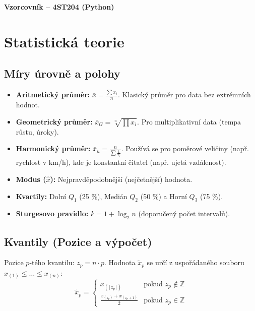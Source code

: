 \documentclass[a4paper, 11pt]{article}
\begin{document}
\begin{center}
\Huge \textbf{Vzorcovník -- 4ST204 (Python)}
\end{center}

\section{Statistická teorie}

\subsection*{Míry úrovně a polohy}
\begin{itemize}[noitemsep]
    \item \textbf{Aritmetický průměr:} $\bar{x} = \frac{\sum x_i}{n}$. Klasický průměr pro data bez extrémních hodnot.
    \item \textbf{Geometrický průměr:} $\bar{x}_{G} = \sqrt[n]{\prod x_i}$. Pro multiplikativní data (tempa růstu, úroky).
    \item \textbf{Harmonický průměr:} $\bar{x}_h = \frac{n}{\sum \frac{1}{x_i}}$. Používá se pro poměrové veličiny (např. rychlost v km/h), kde je konstantní čitatel (např. ujetá vzdálenost).
    \item \textbf{Modus ($\hat{x}$):} Nejpravděpodobnější (nejčetnější) hodnota.
    \item \textbf{Kvartily:} Dolní $Q_1$ (25 \%), Medián $Q_2$ (50 \%) a Horní $Q_3$ (75 \%).
    \item \textbf{Sturgesovo pravidlo:} $k = 1 + \log_2 n$ (doporučený počet intervalů).
\end{itemize}

\subsection*{Kvantily (Pozice a výpočet)}
Pozice $p$-tého kvantilu: $z_p = n \cdot p$. Hodnota $\tilde{x}_p$ se určí z uspořádaného souboru $x_{(1)} \le \dots \le x_{(n)}$:
\begin{equation*}
\tilde{x}_p = 
\begin{cases} 
x_{(\lceil z_p \rceil)} & \text{pokud } z_p \notin \mathbb{Z} \\
\frac{x_{(z_p)} + x_{(z_p+1)}}{2} & \text{pokud } z_p \in \mathbb{Z}
\end{cases}
\end{equation*}
\end{document}
